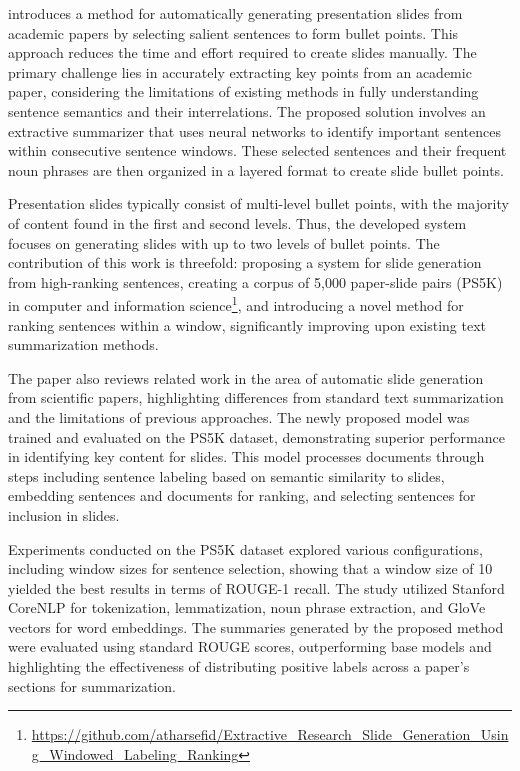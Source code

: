 \citet{Sefid:2021:arXiv} introduces a method for automatically generating presentation slides from academic papers by selecting salient sentences to form bullet points. This approach reduces the time and effort required to create slides manually. The primary challenge lies in accurately extracting key points from an academic paper, considering the limitations of existing methods in fully understanding sentence semantics and their interrelations. The proposed solution involves an extractive summarizer that uses neural networks to identify important sentences within consecutive sentence windows. These selected sentences and their frequent noun phrases are then organized in a layered format to create slide bullet points.

Presentation slides typically consist of multi-level bullet points, with the majority of content found in the first and second levels. Thus, the developed system focuses on generating slides with up to two levels of bullet points. The contribution of this work is threefold: proposing a system for slide generation from high-ranking sentences, creating a corpus of 5,000 paper-slide pairs (PS5K) in computer and information science\footnote{\url{https://github.com/atharsefid/Extractive_Research_Slide_Generation_Using_Windowed_Labeling_Ranking}}, and introducing a novel method for ranking sentences within a window, significantly improving upon existing text summarization methods.

The paper also reviews related work in the area of automatic slide generation from scientific papers, highlighting differences from standard text summarization and the limitations of previous approaches. The newly proposed model was trained and evaluated on the PS5K dataset, demonstrating superior performance in identifying key content for slides. This model processes documents through steps including sentence labeling based on semantic similarity to slides, embedding sentences and documents for ranking, and selecting sentences for inclusion in slides.

Experiments conducted on the PS5K dataset explored various configurations, including window sizes for sentence selection, showing that a window size of 10 yielded the best results in terms of ROUGE-1 recall. The study utilized Stanford CoreNLP for tokenization, lemmatization, noun phrase extraction, and GloVe vectors for word embeddings. The summaries generated by the proposed method were evaluated using standard ROUGE scores, outperforming base models and highlighting the effectiveness of distributing positive labels across a paper's sections for summarization.

